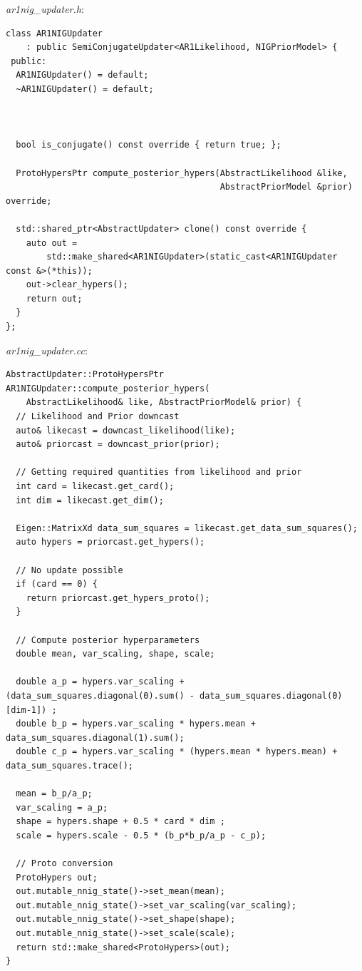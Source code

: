 \documentclass[12pt,a4paper]{article}
\begin{document}
\textit{ar1nig\_updater.h}:
\begin{lstlisting} 
class AR1NIGUpdater
    : public SemiConjugateUpdater<AR1Likelihood, NIGPriorModel> {
 public:
  AR1NIGUpdater() = default;
  ~AR1NIGUpdater() = default;



  bool is_conjugate() const override { return true; };

  ProtoHypersPtr compute_posterior_hypers(AbstractLikelihood &like,
                                          AbstractPriorModel &prior) override;

  std::shared_ptr<AbstractUpdater> clone() const override {
    auto out =
        std::make_shared<AR1NIGUpdater>(static_cast<AR1NIGUpdater const &>(*this));
    out->clear_hypers();
    return out;
  }
};
\end{lstlisting}

\textit{ar1nig\_updater.cc}:
\begin{lstlisting} 
AbstractUpdater::ProtoHypersPtr AR1NIGUpdater::compute_posterior_hypers(
    AbstractLikelihood& like, AbstractPriorModel& prior) {
  // Likelihood and Prior downcast
  auto& likecast = downcast_likelihood(like);
  auto& priorcast = downcast_prior(prior);

  // Getting required quantities from likelihood and prior
  int card = likecast.get_card();
  int dim = likecast.get_dim();

  Eigen::MatrixXd data_sum_squares = likecast.get_data_sum_squares();
  auto hypers = priorcast.get_hypers();

  // No update possible
  if (card == 0) {
    return priorcast.get_hypers_proto();
  }

  // Compute posterior hyperparameters
  double mean, var_scaling, shape, scale;
  
  double a_p = hypers.var_scaling + (data_sum_squares.diagonal(0).sum() - data_sum_squares.diagonal(0)[dim-1]) ;
  double b_p = hypers.var_scaling * hypers.mean + data_sum_squares.diagonal(1).sum();
  double c_p = hypers.var_scaling * (hypers.mean * hypers.mean) + data_sum_squares.trace();

  mean = b_p/a_p;
  var_scaling = a_p;
  shape = hypers.shape + 0.5 * card * dim ;
  scale = hypers.scale - 0.5 * (b_p*b_p/a_p - c_p);

  // Proto conversion
  ProtoHypers out;
  out.mutable_nnig_state()->set_mean(mean);
  out.mutable_nnig_state()->set_var_scaling(var_scaling);
  out.mutable_nnig_state()->set_shape(shape);
  out.mutable_nnig_state()->set_scale(scale);
  return std::make_shared<ProtoHypers>(out);
}

 \end{lstlisting}
\end{document}
